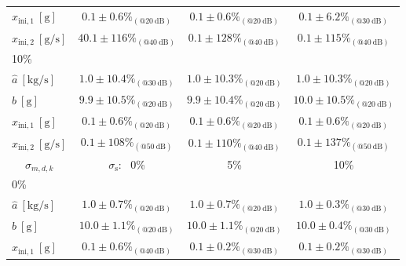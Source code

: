 \begin{table}[h!]
\begin{tabular}{c| c c c}
\multicolumn{1}{l|}{\hspace{2mm} $\widehat{x}_{\mathrm{ini,1}} \ \mathrm{[g]}$} & $0.1 \pm 0.6 \%_{(@20 \ \mathrm{dB})}$ & $0.1 \pm 0.6 \%_{(@20 \ \mathrm{dB})}$ & $0.1 \pm 6.2 \%_{(@30 \ \mathrm{dB})}$ \\
 \multicolumn{1}{l|}{\hspace{2mm} $\widehat{x}_{\mathrm{ini,2}} \ \mathrm{[g/s]}$} & $40.1 \pm 116 \%_{(@40 \ \mathrm{dB})}$ & $0.1 \pm 128 \%_{(@40 \ \mathrm{dB})}$ & $0.1 \pm 115 \%_{(@40 \ \mathrm{dB})}$ \\
 \multicolumn{1}{l|}{10\%} \\
 \multicolumn{1}{l|}{\hspace{2mm} $\widehat{a} \ \mathrm{[kg/s]}$} & $1.0 \pm 10.4 \%_{(@30 \ \mathrm{dB})}$ & $1.0 \pm 10.3 \%_{(@20 \ \mathrm{dB})}$ & $1.0 \pm 10.3 \%_{(@20 \ \mathrm{dB})}$ \\ 
 \multicolumn{1}{l|}{\hspace{2mm} $\widehat{b} \ \mathrm{[g]}$} & $9.9 \pm 10.5 \%_{(@20 \ \mathrm{dB})}$ & $9.9 \pm 10.4 \%_{(@20 \ \mathrm{dB})}$ & $10.0 \pm 10.5 \%_{(@20 \ \mathrm{dB})}$ \\ 
\multicolumn{1}{l|}{\hspace{2mm} $\widehat{x}_{\mathrm{ini,1}} \ \mathrm{[g]}$} & $0.1 \pm 0.6 \%_{(@20 \ \mathrm{dB})}$ & $0.1 \pm 0.6 \%_{(@20 \ \mathrm{dB})}$ & $0.1 \pm 0.6 \%_{(@20 \ \mathrm{dB})}$ \\
 \multicolumn{1}{l|}{\hspace{2mm} $\widehat{x}_{\mathrm{ini,2}} \ \mathrm{[g/s]}$} & $0.1 \pm 108 \%_{(@50 \ \mathrm{dB})}$ & $0.1 \pm 110 \%_{(@40 \ \mathrm{dB})}$ & $0.1 \pm 137 \%_{(@50 \ \mathrm{dB})}$ \\ 
 \hline
 $\sigma_{{m},{d},{k}}$ & $\sigma_{\mathrm{s}}$: \ 0\% & 5\% & 10\% \\
 \hline
 \multicolumn{1}{l|}{0\%} \\
 \multicolumn{1}{l|}{\hspace{2mm} $\widehat{a} \ \mathrm{[kg/s]}$} & $1.0 \pm 0.7 \%_{(@20 \ \mathrm{dB})}$ &  $1.0 \pm 0.7 \%_{(@20 \ \mathrm{dB})}$ & $1.0 \pm 0.3 \%_{(@30 \ \mathrm{dB})}$ \\ 
 \multicolumn{1}{l|}{\hspace{2mm} $\widehat{b} \ \mathrm{[g]}$} & $10.0 \pm 1.1 \%_{(@20 \ \mathrm{dB})}$ & $10.0 \pm 1.1 \%_{(@20 \ \mathrm{dB})}$ & $10.0 \pm 0.4 \%_{(@30 \ \mathrm{dB})}$ \\ 
 \multicolumn{1}{l|}{\hspace{2mm} $\widehat{x}_{\mathrm{ini,1}} \ \mathrm{[g]}$} & $0.1 \pm 0.6 \%_{(@40 \ \mathrm{dB})}$ & $0.1 \pm 0.2 \%_{(@30 \ \mathrm{dB})}$ & $0.1 \pm 0.2 \%_{(@30 \ \mathrm{dB})}$ \\

\end{tabular}
\end{table}
